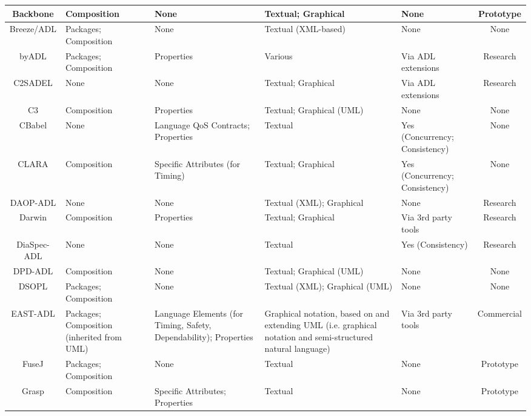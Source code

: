 \begin{landscape}
\begin{longtable}{|c|P{2cm}|P{3cm}|P{3cm}|p{2cm}|c|}
Backbone & Composition & None & Textual; Graphical & None & Prototype \\ 
\hline

Breeze/ADL & Packages; Composition & None & Textual (XML-based) & None & None \\ 
\hline

byADL & Packages; Composition & Properties & Various & Via ADL extensions & Research \\ 
\hline

C2SADEL & None & None & Textual; Graphical & Via ADL extensions & Research \\ 
\hline

C3 & Composition & Properties & Textual; Graphical (UML) & None & None \\ 
\hline

CBabel & None & Language QoS Contracts; Properties & Textual & Yes (Concurrency; Consistency) & None \\ 
\hline

CLARA & Composition & Specific Attributes (for Timing) & Textual; Graphical & Yes (Concurrency; Consistency) & None \\ 
\hline

DAOP-ADL & None & None & Textual (XML); Graphical & None & Research \\ 
\hline

Darwin & Composition & Properties & Textual; Graphical & Via 3rd party tools & Research \\ 
\hline

DiaSpec-ADL & None & None & Textual & Yes (Consistency) & Research \\ 
\hline

DPD-ADL & Composition & None & Textual; Graphical (UML) & None & None \\ 
\hline

DSOPL & Packages; Composition & None & Textual (XML); Graphical (UML) & None & None \\ 
\hline

EAST-ADL & Packages; Composition (inherited from UML) & Language Elements (for Timing, Safety, Dependability); Properties & Graphical notation, based on and extending UML (i.e. graphical notation and semi-structured natural language) & Via 3rd party tools & Commercial \\ 
\hline

FuseJ & Packages; Composition & None & Textual & None & Prototype \\ 
\hline

Grasp & Composition & Specific Attributes; Properties & Textual & None & Prototype \\ 
\hline


\end{longtable}
\end{landscape}

